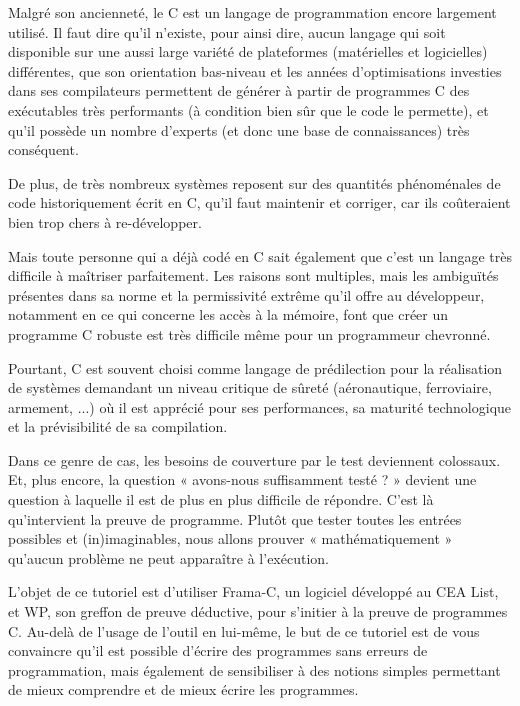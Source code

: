 \newpage


Malgré son ancienneté, le C est un langage de programmation encore largement
utilisé. Il faut dire qu'il n'existe, pour ainsi dire, aucun langage qui soit
disponible sur une aussi large variété de plateformes (matérielles et
logicielles) différentes, que son orientation bas-niveau et les années
d'optimisations investies dans ses compilateurs permettent de générer à
partir de programmes C des exécutables très performants (à condition bien sûr
que le code le permette), et qu'il possède un nombre d'experts (et donc une
base de connaissances) très conséquent.



De plus, de très nombreux systèmes reposent sur des quantités phénoménales de
code historiquement écrit en C, qu'il faut maintenir et corriger, car ils
coûteraient bien trop chers à re-développer.



Mais toute personne qui a déjà codé en C sait également que c'est un langage
très difficile à maîtriser parfaitement. Les raisons sont multiples, mais les
ambiguïtés présentes dans sa norme et la permissivité extrême qu'il offre au
développeur, notamment en ce qui concerne les accès à la mémoire, font que
créer un programme C robuste est très difficile même pour un programmeur
chevronné.



Pourtant, C est souvent choisi comme langage de prédilection pour la
réalisation de systèmes demandant un niveau critique de sûreté (aéronautique,
ferroviaire, armement, ...) où il est apprécié pour ses performances, sa
maturité technologique et la prévisibilité de sa compilation.



Dans ce genre de cas, les besoins de couverture par le test deviennent
colossaux. Et, plus encore, la question « avons-nous suffisamment testé ? »
devient une question à laquelle il est de plus en plus difficile de répondre.
C'est là qu'intervient la preuve de programme. Plutôt que tester toutes les
entrées possibles et (in)imaginables, nous allons prouver « mathématiquement »
qu'aucun problème ne peut apparaître à l'exécution.



L'objet de ce tutoriel est d'utiliser Frama-C, un logiciel développé au
CEA List, et WP, son greffon de preuve déductive, pour s'initier à la preuve
de programmes C. Au-delà de l'usage de l'outil en lui-même, le but de ce tutoriel
est de vous convaincre qu'il est possible d'écrire des programmes sans erreurs de
programmation, mais également de sensibiliser à des notions simples
permettant de mieux comprendre et de mieux écrire les programmes.



